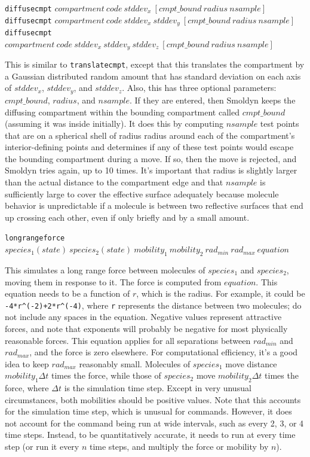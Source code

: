 \documentclass {scrbook}
\newcommand {\ttt} {\texttt}
\begin{document}
\begin{description}
\item{\ttt{diffusecmpt} $compartment\ code\ stddev_x\ [cmpt\_bound\ radius\ nsample]$\\
\ttt{diffusecmpt} $compartment\ code\ stddev_x\ stddev_y\ [cmpt\_bound\ radius\ nsample]$\\
\ttt{diffusecmpt} $compartment\ code\ stddev_x\ stddev_y\ stddev_z\ [cmpt\_bound\ radius\ nsample]$}

This is similar to \ttt{translatecmpt}, except that this translates the compartment by a Gaussian distributed random amount that has standard deviation on each axis of $stddev_x$, $stddev_y$, and $stddev_z$. Also, this has three optional parameters: $cmpt\_bound$, $radius$, and $nsample$. If they are entered, then Smoldyn keeps the diffusing compartment within the bounding compartment called $cmpt\_bound$ (assuming it was inside initially). It does this by computing $nsample$ test points that are on a spherical shell of radius radius around each of the compartment's interior-defining points and determines if any of these test points would escape the bounding compartment during a move. If so, then the move is rejected, and Smoldyn tries again, up to 10 times. It's important that radius is slightly larger than the actual distance to the compartment edge and that $nsample$ is sufficiently large to cover the effective surface adequately because molecule behavior is unpredictable if a molecule is between two reflective surfaces that end up crossing each other, even if only briefly and by a small amount.

\item{\ttt{longrangeforce} $species_1(state)\ species_2(state)\ mobility_1\ mobility_2\ rad_{min}\ rad_{max}\ equation$}

This simulates a long range force between molecules of $species_1$ and $species_2$, moving them in response to it. The force is computed from $equation$. This equation needs to be a function of $r$, which is the radius. For example, it could be \ttt{-4*r\^{}(-2)+2*r\^{}(-4)}, where \ttt{r} represents the distance between two molecules; do not include any spaces in the equation. Negative values represent attractive forces, and note that exponents will probably be negative for most physically reasonable forces. This equation applies for all separations between $rad_{min}$ and $rad_{max}$, and the force is zero elsewhere. For computational efficiency, it's a good idea to keep $rad_{max}$ reasonably small. Molecules of $species_1$ move distance $mobility_1 \Delta t$ times the force, while those of $species_2$ move $mobility_2 \Delta t$ times the force, where $\Delta t$ is the simulation time step. Except in very unusual circumstances, both mobilities should be positive values. Note that this accounts for the simulation time step, which is unusual for commands. However, it does not account for the command being run at wide intervals, such as every 2, 3, or 4 time steps. Instead, to be quantitatively accurate, it needs to run at every time step (or run it every $n$ time steps, and multiply the force or mobility by $n$).

\end{description}
\end{document}
